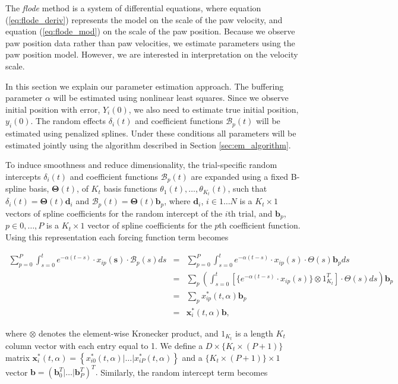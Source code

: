 \documentclass[preprint]{JASA}
\begin{document}
The \emph{flode} method is a system of differential equations, where
equation (\ref{eq:flode_deriv}) represents the model on the scale of the
paw velocity, and equation (\ref{eq:flode_mod}) on the scale of the paw
position. Because we observe paw position data rather than paw
velocities, we estimate parameters using the paw position model.
However, we are interested in interpretation on the velocity scale.

In this section we explain our parameter estimation approach. The
buffering parameter \(\alpha\) will be estimated using nonlinear least
squares. Since we observe initial position with error, \(Y_i(0)\), we
also need to estimate true initial position, \(y_i(0)\). The random
effects \(\delta_i(t)\) and coefficient functions \(\mathcal{B}_p(t)\)
will be estimated using penalized splines. Under these conditions all
parameters will be estimated jointly using the algorithm described in
Section \ref{sec:em_algorithm}.

To induce smoothness and reduce dimensionality, the trial-specific
random intercepts \(\delta_i(t)\) and coefficient functions
\(\mathcal{B}_p(t)\) are expanded using a fixed B-spline basis,
\(\mathbf{\Theta}(t)\), of \(K_t\) basis functions
\(\theta_1(t),\ldots , \theta_{K_t}(t)\), such that
\(\delta_i(t) = \mathbf{\Theta}(t)\mathbf{d}_i\) and
\(\mathcal{B}_p(t) = \mathbf{\Theta}(t)\mathbf{b}_p\), where
\(\mathbf{d}_i\), \(i \in 1\ldots N\) is a \(K_t \times 1\) vectors of
spline coefficients for the random intercept of the \(i\)th trial, and
\(\mathbf{b}_p\), \(p \in 0, \ldots, P\) is a \(K_t \times 1\) vector of
spline coefficients for the \(p\)th coefficient function. Using this
representation each forcing function term becomes

\begin{eqnarray*}
\sum_{p=0}^P \int_{s=0}^t e^{-\alpha (t-s)} \cdot x_{ip}(\mathbf{s}) \cdot \mathcal{B}_p(s) ds &=&\sum_{p=0}^P \int_{s=0}^t e^{-\alpha (t-s)} \cdot x_{ip}(s) \cdot  \Theta(s)\mathbf{b}_p ds \\[5mm]
&=& \sum_p \left(\int_{s=0}^t \left[\{e^{-\alpha (t-s)}\cdot x_{ip}(s)\}\otimes 1^T_{K_t}\right] \cdot \Theta(s) ds\right)\mathbf{b}_p \\[5mm]
&=& \sum_px_{ip}^*(t, \alpha)\mathbf{b}_p\\
&=& \mathbf{x}_i^*(t, \alpha)\mathbf{b},
\end{eqnarray*}

\noindent where \(\otimes\) denotes the element-wise Kronecker product,
and \(1_{K_t}\) is a length \(K_t\) column vector with each entry equal
to 1. We define a \(D \times \{K_t \times (P + 1)\}\) matrix
\(\mathbf{x}_i^*(t, \alpha) = \left\{x_{i0}^*(t, \alpha) | \ldots | x_{iP}^*(t, \alpha) \right\}\)
and a \(\{K_t \times (P + 1)\} \times 1\) vector
\(\mathbf{b} = \left(\mathbf{b}_0^T | \ldots | \mathbf{b}_P^T \right)^T.\)
Similarly, the random intercept term becomes
\end{document}

